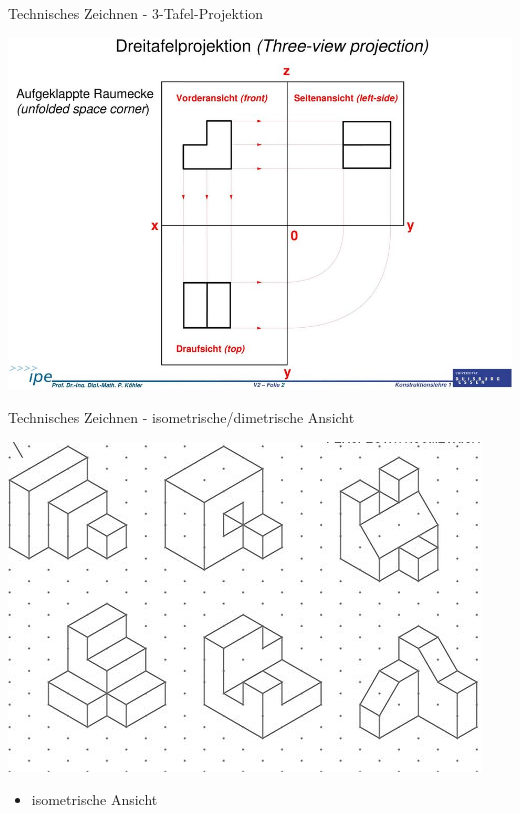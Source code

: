 \documentclass[11pt]{beamer}
\begin{document}
\begin{frame}{Technisches Zeichnen - 3-Tafel-Projektion}

\begin{center}
\includegraphics[scale=1]{page_2.jpg}
\end{center}

	
\end{frame}












\begin{frame}{Technisches Zeichnen - isometrische/dimetrische Ansicht}

\begin{center}
\includegraphics[scale=0.5]{iso.jpg}
\end{center}

\begin{itemize}
\item isometrische Ansicht
\end{itemize}
	
\end{frame}
\end{document}
